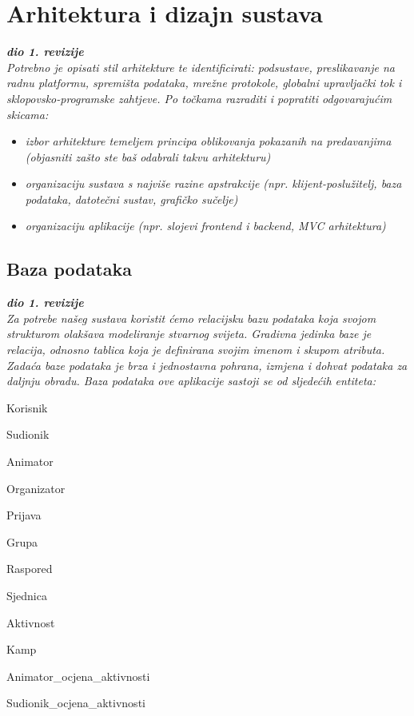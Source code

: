 \chapter{Arhitektura i dizajn sustava}
		
		\textbf{\textit{dio 1. revizije}}\\

		\textit{ Potrebno je opisati stil arhitekture te identificirati: podsustave, preslikavanje na radnu platformu, spremišta podataka, mrežne protokole, globalni upravljački tok i sklopovsko-programske zahtjeve. Po točkama razraditi i popratiti odgovarajućim skicama:}
	\begin{itemize}
		\item 	\textit{izbor arhitekture temeljem principa oblikovanja pokazanih na predavanjima (objasniti zašto ste baš odabrali takvu arhitekturu)}
		\item 	\textit{organizaciju sustava s najviše razine apstrakcije (npr. klijent-poslužitelj, baza podataka, datotečni sustav, grafičko sučelje)}
		\item 	\textit{organizaciju aplikacije (npr. slojevi frontend i backend, MVC arhitektura) }		
	\end{itemize}

	
		

		

				
		\section{Baza podataka}
			
			\textbf{\textit{dio 1. revizije}}\\
			
		\textit{Za potrebe našeg sustava koristit ćemo relacijsku bazu podataka koja svojom strukturom olakšava modeliranje stvarnog svijeta. Gradivna jedinka baze je relacija, odnosno tablica koja je definirana svojim imenom i skupom atributa. Zadaća baze podataka je brza i jednostavna pohrana, izmjena i dohvat podataka za daljnju obradu. Baza podataka ove aplikacije sastoji se od sljedećih entiteta:}
		\begin{packed_item}
			\item Korisnik
			\item Sudionik
			\item Animator
			\item Organizator
			\item Prijava
			\item Grupa
			\item Raspored
			\item Sjednica
			\item Aktivnost
			\item Kamp
			\item Animator\_ocjena\_aktivnosti
			\item Sudionik\_ocjena\_aktivnosti
		\end{packed_item}
